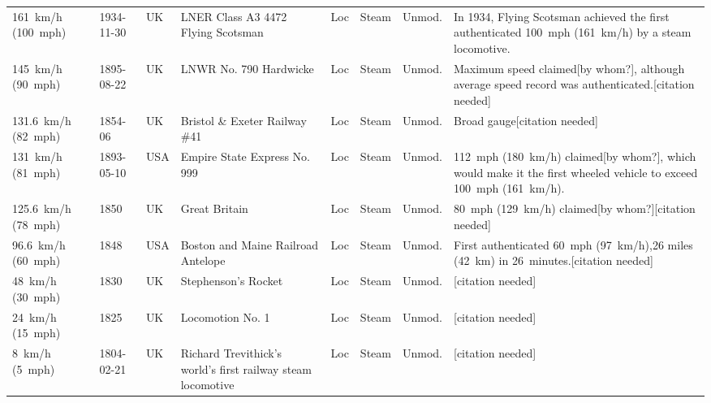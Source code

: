 \documentclass{article}
\begin{document}
\begin{tabular}{llllllll}
161 km/h (100 mph) & 1934-11-30 & UK & LNER Class A3 4472 Flying Scotsman & Loc & Steam & Unmod. & In 1934, Flying Scotsman achieved the first authenticated 100 mph (161 km/h) by a steam locomotive. \\
145 km/h (90 mph) & 1895-08-22 & UK & LNWR No. 790 Hardwicke & Loc & Steam & Unmod. & Maximum speed claimed[by whom?], although average speed record was authenticated.[citation needed] \\
131.6 km/h (82 mph) & 1854-06 & UK & Bristol \& Exeter Railway \#41 & Loc & Steam & Unmod. & Broad gauge[citation needed] \\
131 km/h (81 mph) & 1893-05-10 & USA & Empire State Express No. 999 & Loc & Steam & Unmod. & 112 mph (180 km/h) claimed[by whom?], which would make it the first wheeled vehicle to exceed 100 mph (161 km/h). \\
125.6 km/h (78 mph) & 1850 & UK & Great Britain & Loc & Steam & Unmod. & 80 mph (129 km/h) claimed[by whom?][citation needed] \\
96.6 km/h (60 mph) & 1848 & USA & Boston and Maine Railroad Antelope & Loc & Steam & Unmod. & First authenticated 60 mph (97 km/h),26 miles (42 km) in 26 minutes.[citation needed] \\
48 km/h (30 mph) & 1830 & UK & Stephenson's Rocket & Loc & Steam & Unmod. & [citation needed] \\
24 km/h (15 mph) & 1825 & UK & Locomotion No. 1 & Loc & Steam & Unmod. & [citation needed] \\
8 km/h (5 mph) & 1804-02-21 & UK & Richard Trevithick's world's first railway steam locomotive & Loc & Steam & Unmod. & [citation needed] \\
\bottomrule
\end{tabular}
\end{document}
